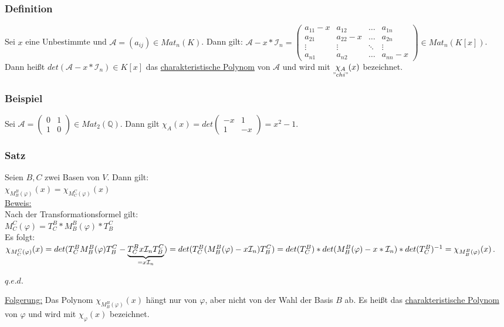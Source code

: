 \documentclass[a4paper]{article}
\newcommand{\ul}{\underline}
\renewcommand{\qed}{\begin{flushright}
\ul{\(q.e.d.\)}
\end{flushright}}
\let\phi\varphi
\begin{document}
\subsubsection{Definition}
Sei \(x\) eine Unbestimmte und \(\mathcal{A} = (a_{ij}) \in Mat_n(K)\). Dann gilt: \(\mathcal{A}-x*\mathcal{I}_n=\begin{pmatrix}
a_{11}-x & a_{12} & \hdots & a_{1n} \\
a_{21} & a_{22}-x & \hdots & a_{2n} \\
\vdots & \vdots & \ddots & \vdots \\
a_{n1} & a_{n2} & \hdots & a_{nn}-x
\end{pmatrix} \in Mat_n(K[x])\).\\
Dann heißt \(det(\mathcal{A}-x*\mathcal{I}_n)\in K[x]\) das \ul{charakteristische Polynom} von \(\mathcal{A}\) und wird mit \(\underset{"chi"}{\chi_A}(x)\) bezeichnet.
\subsubsection{Beispiel}
Sei \(\mathcal{A}=\begin{pmatrix}
0 & 1 \\
1 & 0
\end{pmatrix} \in Mat_2(\mathbb{Q})\). Dann gilt \(\chi_A(x)=det\begin{pmatrix}
-x & 1 \\
1 & -x
\end{pmatrix}=x^2-1\).
\subsubsection{Satz}
Seien \(B,C\) zwei Basen von \(V\). Dann gilt:\\
\(\chi_{M_B^B(\phi)}(x)=\chi_{M_C^C(\phi)}(x)\)\\
\ul{Beweis:}\\
Nach der Transformationsformel gilt:\\
\(M_C^C(\phi)=T_C^B*M_B^B(\phi)*T_B^C\)\\
Es folgt: \(\chi_{M_C^C(\phi)}(x)=det(T_C^BM_B^B(\phi)T_B^C-\underbrace{T_C^Bx\mathcal{I}_nT_B^C}_{=x\mathcal{I}_n})\\=det(T_C^B(M_B^B(\phi)-x\mathcal{I}_n)T_B^C)\\=det(T_C^B)*det(M_B^B(\phi)-x*\mathcal{I}_n)*det(T_C^B)^{-1}=\chi_{M_B^B(\phi)}(x)\).
\qed
\ul{Folgerung:} Das Polynom \(\chi_{M_B^B(\phi)}(x)\) hängt nur von \(\phi\), aber nicht von der Wahl der Basis \(B\) ab. Es heißt das \ul{charakteristische Polynom} von \(\phi\) und wird mit \(\chi_\phi(x)\) bezeichnet.
\end{document}
